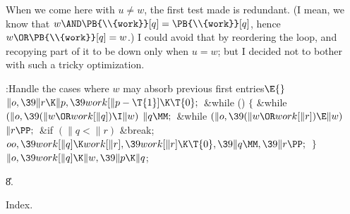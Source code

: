 When we come here with $u\ne w$, the first test made is
redundant. (I mean, we know that $w\AND\PB{\\{work}}[q]=\PB{\\{work}}[q]$,
hence
$w\OR\PB{\\{work}}[q]=w$.) I could avoid that by reordering the loop, and
recopying part of it to be down only when $u=w$;
but I decided not to bother with such a tricky optimization.

\Y\B\4:Handle the cases where $w$ may absorb previous first entries\X${}%
\E{}$\6
$\|o,\39\|r\K\|p,\39\\{work}[\|p-\T{1}]\K\T{0};{}$\6
\&{while} ()\5
${}\{{}$\1\6
\&{while} ${}(\|o,\39(\|w\OR\\{work}[\|q])\I\|w){}$\1\5
${}\|q\MM;{}$\2\6
\&{while} ${}(\|o,\39(\|w\OR\\{work}[\|r])\E\|w){}$\1\5
${}\|r\PP;{}$\2\6
\&{if} ${}(\|q<\|r){}$\1\5
\&{break};\2\6
${}\\{oo},\39\\{work}[\|q]\K\\{work}[\|r],\39\\{work}[\|r]\K\T{0},\39\|q\MM,\39%
\|r\PP;{}$\6
\4${}\}{}$\2\6
${}\|o,\39\\{work}[\|q]\K\|w,\39\|p\K\|q{}$;\par
\U8.\fi

Index.
\fi

\inx
\fin
\con
